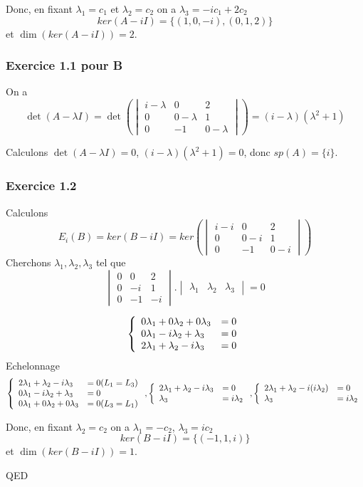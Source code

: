 \documentclass[]{book}
\theoremstyle{definition}
\begin{document}
Donc, en fixant $\lambda_1 = c_1$ et $\lambda_2=c_2$ on a $\lambda_3 = -ic_1+2c_2$
$$ker(A-iI) = \{(1,0,-i), (0,1,2)\}$$ 
et $\dim(ker(A-iI)) = 2$.

\subsubsection*{Exercice 1.1 pour B}
On a 
$$\det(A -\lambda I) = \det\left(\begin{vmatrix} i-\lambda & 0 & 2 \\ 0 & 0-\lambda & 1 \\ 0 & -1 & 0-\lambda \end{vmatrix}\right) = (i-\lambda)(\lambda^2+1)$$

Calculons $\det(A -\lambda I) = 0$, $(i-\lambda)(\lambda^2+1)=0$, donc $sp(A)=\{i\}$. 

\subsubsection*{Exercice 1.2}
Calculons
$$E_{i}(B) = ker(B -iI) = ker\left(\begin{vmatrix} i-i & 0 & 2 \\ 0 & 0-i & 1 \\ 0 & -1 & 0-i \end{vmatrix}\right)$$
Cherchons $\lambda_1,\lambda_2,\lambda_3$  tel que
$$\begin{vmatrix} 0 & 0 & 2 \\ 0 & -i & 1 \\ 0 & -1 & -i \end{vmatrix}.\begin{vmatrix} \lambda_1 & \lambda_2 & \lambda_3 \end{vmatrix} = 0$$

$$
\left\{ 
\begin{array}{l l}
0\lambda_{1} + 0\lambda_{2} + 0\lambda_{3} & = 0\\
0\lambda_{1} - i\lambda_{2} + \lambda_{3} & = 0\\
2\lambda_{1} + \lambda_{2} - i\lambda_{3} & = 0\\
\end{array}
\right. 
$$ 
Echelonnage
$$
\left\{ 
\begin{array}{l l}
2\lambda_{1} + \lambda_{2} - i\lambda_{3} & = 0 (L_1=L_3)\\
0\lambda_{1} - i\lambda_{2} + \lambda_{3} & = 0\\
0\lambda_{1} + 0\lambda_{2} + 0\lambda_{3} & = 0 (L_3=L_1)\\
\end{array}
\right. 
,
\left\{ 
\begin{array}{l l}
2\lambda_{1} + \lambda_{2} - i\lambda_{3} & = 0\\
\lambda_{3} & = i\lambda_{2}\\
\end{array}
\right. 
,
\left\{ 
\begin{array}{l l}
2\lambda_{1} + \lambda_{2} - i(i\lambda_{2}) & = 0\\
\lambda_{3} & = i\lambda_{2}\\
\end{array}
\right. 
$$ 

Donc, en fixant $\lambda_2 = c_2$ on a $\lambda_1 = -c_2$, $\lambda_3 = ic_2$
$$ker(B-iI) = \{(-1,1,i)\}$$ 
et $\dim(ker(B-iI)) = 1$.


QED
\end{document}
